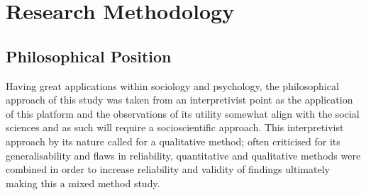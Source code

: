 \documentclass[lettersize,journal]{IEEEtran}
\begin{document}
\section{Research Methodology}

        \subsection{Philosophical Position}
        Having great applications within sociology and psychology, the philosophical approach of this study was taken from an 
        interpretivist point as the application of this platform and the observations of its utility somewhat align with the social
         sciences and as such will require a socioscientific approach. This interpretivist approach by its nature called for a qualitative
         method; often criticised for its generalisability and flaws in reliability, quantitative and qualitative methods were combined
         in order to increase reliability and validity of findings ultimately making this a mixed method study.
\end{document}
